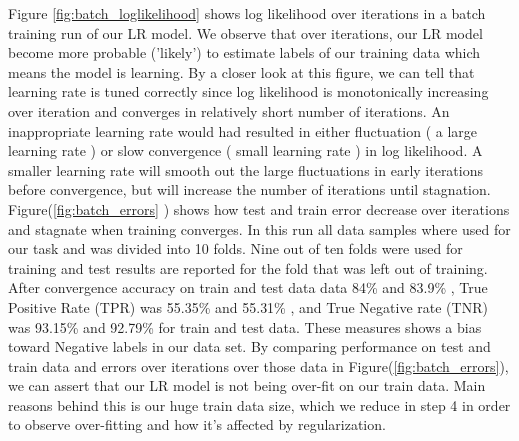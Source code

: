 \documentclass[a4paper,11pt]{article}
\begin{document}
Figure \ref{fig:batch_loglikelihood} shows log likelihood over iterations in a batch training run of our LR model. We observe that over iterations, our LR model become more probable ('likely') to estimate labels of our training data which means the model is learning. By a closer look at this figure, we can tell that learning rate is tuned correctly since log likelihood is monotonically increasing over iteration and converges in relatively short number of iterations. An inappropriate learning rate would had resulted in either fluctuation ( a large learning rate ) or slow convergence ( small learning rate ) in log likelihood. A smaller learning rate will smooth out the large fluctuations in early iterations before convergence, but will increase the number of iterations until stagnation.
Figure(\ref{fig:batch_errors} ) shows how test and train error decrease over iterations and stagnate when training converges. In this run all data samples where used for our task and was divided into 10 folds. Nine out of ten folds were used for training and test results are reported for the fold that was left out of training. After convergence accuracy on train and test data data 84\% and 83.9\% , True Positive Rate (TPR) was 55.35\% and 55.31\% , and True Negative rate (TNR) was 93.15\% and 92.79\% for train and test data. These measures shows a bias toward Negative labels in our data set. By comparing performance on test and train data and errors over iterations over those data in Figure(\ref{fig:batch_errors}), we can assert that our LR model is not being over-fit on our train data. Main reasons behind this is our huge train data size, which we reduce in step 4 in order to observe over-fitting and how it's affected by regularization.
\end{document}
